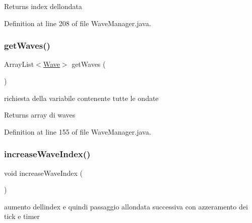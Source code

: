 \begin{DoxyReturn}{Returns}
index dell\textquotesingle{}ondata 
\end{DoxyReturn}


Definition at line 208 of file Wave\+Manager.\+java.

\mbox{\label{classmanagers_1_1_wave_manager_a4b2fc7c5f5464fa508eea5af8be4e805}} 
\subsubsection{\texorpdfstring{get\+Waves()}{getWaves()}}
{\footnotesize\ttfamily Array\+List$<$\hyperlink{classevents_1_1_wave}{Wave}$>$ get\+Waves (\begin{DoxyParamCaption}{ }\end{DoxyParamCaption})}



richiesta della variabile contenente tutte le ondate 

\begin{DoxyReturn}{Returns}
array di waves 
\end{DoxyReturn}


Definition at line 155 of file Wave\+Manager.\+java.

\mbox{\label{classmanagers_1_1_wave_manager_a30f46b71db254d0e9ca9e7f3578134c3}} 
\subsubsection{\texorpdfstring{increase\+Wave\+Index()}{increaseWaveIndex()}}
{\footnotesize\ttfamily void increase\+Wave\+Index (\begin{DoxyParamCaption}{ }\end{DoxyParamCaption})}



aumento dell\textquotesingle{}index e quindi passaggio all\textquotesingle{}ondata successiva con azzeramento dei tick e timer 



